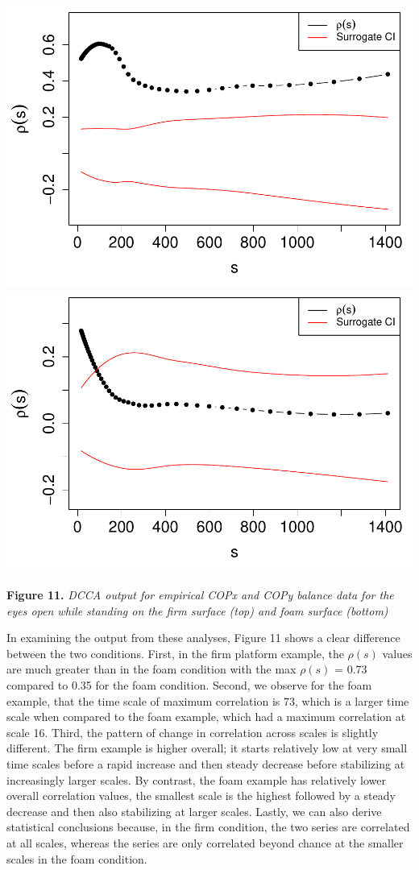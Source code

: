 \documentclass[
  man]{apa6}
\begin{document}
\includegraphics{fractal_regression_paper_brm_files/figure-latex/unnamed-chunk-22-1.pdf} \includegraphics{fractal_regression_paper_brm_files/figure-latex/unnamed-chunk-22-2.pdf}

\textbf{Figure 11.} \emph{DCCA output for empirical COPx and COPy balance data for
the eyes open while standing on the firm surface (top) and foam surface
(bottom)}

In examining the output from these analyses, Figure 11 shows a clear
difference between the two conditions. First, in the firm platform
example, the \(\rho(s)\) values are much greater than in the foam
condition with the max \(\rho(s)\) = 0.73
compared to 0.35 for the foam condition.
Second, we observe for the foam example, that the time scale of maximum
correlation is
73, which
is a larger time scale when compared to the foam example, which had a
maximum correlation at scale
16. Third,
the pattern of change in correlation across scales is slightly
different. The firm example is higher overall; it starts relatively low
at very small time scales before a rapid increase and then steady
decrease before stabilizing at increasingly larger scales. By contrast,
the foam example has relatively lower overall correlation values, the
smallest scale is the highest followed by a steady decrease and then
also stabilizing at larger scales. Lastly, we can also derive
statistical conclusions because, in the firm condition, the two series
are correlated at all scales, whereas the series are only correlated
beyond chance at the smaller scales in the foam condition.
\end{document}
